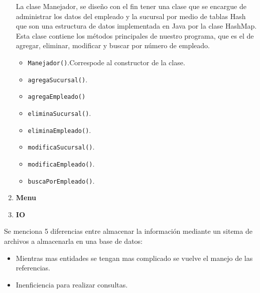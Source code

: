 \documentclass[10pt]{article}
\begin{document}
\begin{enumerate}
    	La clase Manejador, se diseño con el fin tener una clase que se encargue de administrar los datos del empleado y la sucursal por medio de  tablas Hash que son una estructura de datos implementada en Java por la clase HashMap.    Esta clase contiene los métodos principales de nuestro programa, que es el de agregar, eliminar, modificar y buscar por número de empleado.
    	\begin{itemize}
    		\item {\texttt{Manejador()}}.Correspode al constructor de la clase.
    		\item {\texttt{agregaSucursal()}}.
    		\item {\texttt{agregaEmpleado()}}
    		\item {\texttt{eliminaSucursal()}}.
    		\item {\texttt{eliminaEmpleado()}}.
    		\item {\texttt{modificaSucursal()}}.
    		\item {\texttt{modificaEmpleado()}}.
    		\item {\texttt{buscaPorEmpleado()}}.
    	\end{itemize}
    	
    	\item {\bf{Menu}}\\
    	
    	\item {\bf{IO}}\\
    	
    \end{enumerate} 

    
    
    Se menciona 5 diferencias entre almacenar la información mediante un sitema de archivos a almacenarla en una base de datos:
    
    \begin{itemize}
    	\item Mientras mas entidades se tengan mas complicado se vuelve el manejo de las referencias.
    	\item Inenficiencia para realizar consultas.
    \end{itemize}
    
\end{document}

